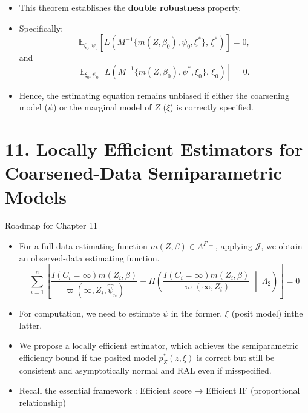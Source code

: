 \documentclass[xcolor=dvipsnames,aspectratio=169]{beamer}
\newcommand{\1}{\mathbbm{1}}
\begin{document}
\begin{frame}
  \begin{tcolorbox}[colframe=Cyan,title=Theorem 10.8]
    \begin{itemize}
      \item This theorem establishes the \textbf{double robustness} property.
      \item Specifically:
      \[
        \mathbb{E}_{\xi_0,\psi_0}
        \left[
          L\!\left(M^{-1}\{m(Z,\beta_0),\psi_0,\xi^\ast\},\,\xi^\ast\right)
        \right] = 0,
      \]
      and
      \[
        \mathbb{E}_{\xi_0,\psi_0}
        \left[
          L\!\left(M^{-1}\{m(Z,\beta_0),\psi^\ast,\xi_0\},\,\xi_0\right)
        \right] = 0.
      \]
      \item Hence, the estimating equation remains unbiased if either
      the coarsening model ($\psi$) or the marginal model of $Z$ ($\xi$) is correctly specified.
    \end{itemize}
  \end{tcolorbox}
\end{frame}

\section{11. Locally Efficient Estimators for Coarsened-Data Semiparametric Models}

\begin{frame}{Roadmap for Chapter 11}
  \begin{itemize}
    \item For a full-data estimating function $m(Z,\beta)\in \Lambda^{F\perp}$, applying $\mathcal{J}$, we obtain an observed-data estimating function.
    \[
    \sum_{i=1}^n \left[
  \frac{ I(C_i = \infty) m(Z_i,\beta) }
       { \varpi(\infty, Z_i, \hat{\psi}_n) }
  - \Pi\!\left(
    \frac{ I(C_i = \infty) m(Z_i,\beta) }
         { \varpi(\infty, Z_i) }
    \;\middle|\; \Lambda_2
  \right)
\right] = 0
    \]
    \item For computation, we need to estimate $\psi$ in the former, $\xi$ (posit model) inthe latter.
    \item We propose a locally efficient estimator, which achieves the semiparametric efficiency bound if the posited model $p_Z^*(z,\xi)$ is correct but still be consistent and asymptotically normal and RAL even if misspecified.
    \item Recall the essential framework : Efficient score → Efficient IF (proportional relationship)
  \end{itemize}
\end{frame}
\end{document}

